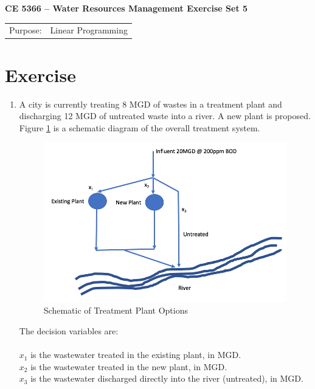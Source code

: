 \documentclass[12pt]{article}
\begin{document}
\begin{center}
{\textbf{{ CE 5366 -- Water Resources Management}  {Exercise Set 5}}}
\end{center}
\begingroup
\begin{tabular}{p{1in} p{5in}}
Purpose: & Linear Programming  \\
\end{tabular}
\endgroup
\section*{\small{Exercise}}
\begin{enumerate}
\item A city is currently treating 8 MGD of wastes in a treatment plant and discharging 12 MGD of untreated waste into a river. 
A new plant is proposed.  
Figure \ref{fig:TreatmentPlants} is a schematic diagram of the overall treatment system.

\begin{figure}[htbp] %
   \centering
   \includegraphics[width=6in]{TreatmentPlants.jpg} 
   \caption{Schematic of Treatment Plant Options}
   \label{fig:TreatmentPlants}
\end{figure}
The decision variables are:\\~\\
$x_1$ is the wastewater treated in the existing plant, in MGD.\\
$x_2$ is the wastewater treated in the new plant, in MGD. \\
$x_3$ is the wastewater discharged directly into the river (untreated), in MGD.\\


\end{enumerate}
\end{document}
